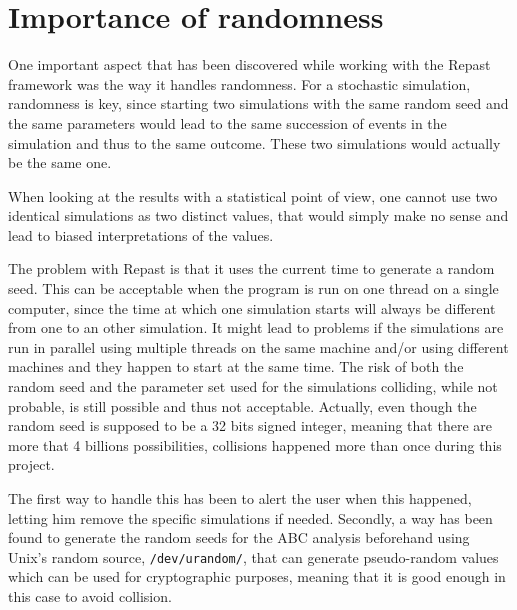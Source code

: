 \documentclass[a4paper,12pt]{report}
\begin{document}
\section{Importance of randomness}
One important aspect that has been discovered while working with the Repast framework was the way it handles randomness. For a stochastic simulation, randomness is key, since starting two simulations with the same random seed and the same parameters would lead to the same succession of events in the simulation and thus to the same outcome. These two simulations would actually be the same one.

When looking at the results with a statistical point of view, one cannot use two identical simulations as two distinct values, that would simply make no sense and lead to biased interpretations of the values.

The problem with Repast is that it uses the current time to generate a random seed. This can be acceptable when the program is run on one thread on a single computer, since the time at which one simulation starts will always be different from one to an other simulation. It might lead to problems if the simulations are run in parallel using multiple threads on the same machine and/or using different machines and they happen to start at the same time. The risk of both the random seed and the parameter set used for the simulations colliding, while not probable, is still possible and thus not acceptable. Actually, even though the random seed is supposed to be a 32 bits signed integer, meaning that there are more that 4 billions possibilities, collisions happened more than once during this project.

The first way to handle this has been to alert the user when this happened, letting him remove the specific simulations if needed. Secondly, a way has been found to generate the random seeds for the ABC analysis beforehand using Unix’s random source, \texttt{/dev/urandom/}, that can generate pseudo-random values which can be used for cryptographic purposes, meaning that it is good enough in this case to avoid collision.
\end{document}
